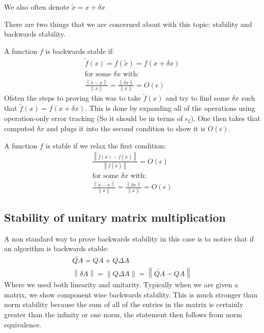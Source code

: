 \documentclass[12pt]{article}
\newcommand{\norm}[1]{\left\lVert#1\right\rVert}
\begin{document}
We also often denote $\tilde x = x+\delta x$

There are two things that we are concerned about with this topic: stability and backwards stability.

A function $f$ is backwards stable if:
\begin{align}
	\tilde f(x) = f(\tilde x)=f(x+\delta x) \\
	\text{for some $\delta x$ with}:        \\
	\frac{\norm{\tilde x-x}}{\norm{x}}=\frac{\norm {\delta x}}{\norm {x}}=O(\epsilon)
\end{align}
Ofsten the steps to proving this was to take $\tilde f(x)$ and try to find some $\delta x$ such that $\tilde f(x)=f(x+\delta x)$. This is done by expanding all of the operations using operation-only error tracking (So it should be in terms of $\epsilon_\xi$). One then takes that computed $\delta x$ and plugs it into the second condition to show it is $O(\epsilon)$.

A function $f$ is stable if we relax the first condition:
\begin{align}
	\frac{\norm{\tilde f(x)-f(\tilde x)}}{\norm{f(\tilde x)}}=O(\epsilon) \\
	\text{for some $\delta x$ with}:                                      \\
	\frac{\norm{\tilde x-x}}{\norm{x}}=\frac{\norm {\delta x}}{\norm {x}}=O(\epsilon)
\end{align}
\subsection{Stability of unitary matrix multiplication}
A non standard way to prove backwards stability in this case is to notice that if an algorithm is backwards stable:
\begin{align}
	\tilde{QA}=QA+Q\Delta A \\
	\norm{\delta A}=\norm{Q\Delta A}=\norm{\tilde{QA}-QA}
\end{align}
Where we used both linearity and unitarity. Typically when we are given a matrix, we show component wise backwards stability. This is much stronger than norm stability because the sum of all of the entries in the matrix is certainly greater than the infinity or one norm, the statement then follows from norm equivalence.
\end{document}
